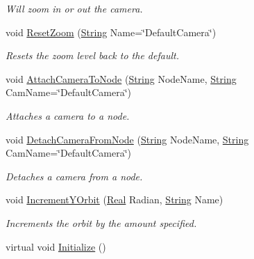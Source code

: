 \begin{DoxyCompactItemize}
\begin{DoxyCompactList}\small\item\em Will zoom in or out the camera. \item\end{DoxyCompactList}\item 
void \hyperlink{classphys_1_1CameraManager_a1cfaf4720fa9af7c0f234d6a2f26e179}{ResetZoom} (\hyperlink{namespacephys_aa03900411993de7fbfec4789bc1d392e}{String} Name=\char`\"{}DefaultCamera\char`\"{})
\begin{DoxyCompactList}\small\item\em Resets the zoom level back to the default. \item\end{DoxyCompactList}\item 
void \hyperlink{classphys_1_1CameraManager_a1cde365b6cab80a33ddf7046489f7af9}{AttachCameraToNode} (\hyperlink{namespacephys_aa03900411993de7fbfec4789bc1d392e}{String} NodeName, \hyperlink{namespacephys_aa03900411993de7fbfec4789bc1d392e}{String} CamName=\char`\"{}DefaultCamera\char`\"{})
\begin{DoxyCompactList}\small\item\em Attaches a camera to a node. \item\end{DoxyCompactList}\item 
void \hyperlink{classphys_1_1CameraManager_a5137bdb9dec706fa0fafec665d4f71c8}{DetachCameraFromNode} (\hyperlink{namespacephys_aa03900411993de7fbfec4789bc1d392e}{String} NodeName, \hyperlink{namespacephys_aa03900411993de7fbfec4789bc1d392e}{String} CamName=\char`\"{}DefaultCamera\char`\"{})
\begin{DoxyCompactList}\small\item\em Detaches a camera from a node. \item\end{DoxyCompactList}\item 
void \hyperlink{classphys_1_1CameraManager_a82001f0874a090717ced3fbe78ce795b}{IncrementYOrbit} (\hyperlink{namespacephys_af7eb897198d265b8e868f45240230d5f}{Real} Radian, \hyperlink{namespacephys_aa03900411993de7fbfec4789bc1d392e}{String} Name)
\begin{DoxyCompactList}\small\item\em Increments the orbit by the amount specified. \item\end{DoxyCompactList}\item 
virtual void \hyperlink{classphys_1_1CameraManager_a5e956b61fa341ae576d8d160da518488}{Initialize} ()

\end{DoxyCompactItemize}
